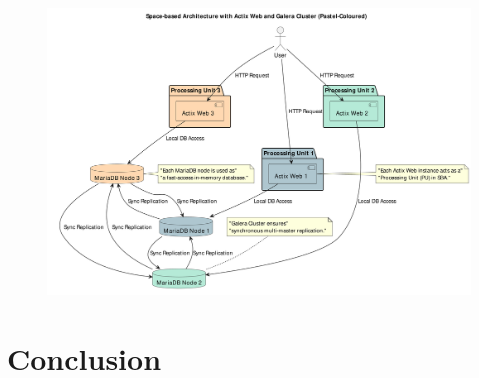 \documentclass[aspectratio=169, table]{beamer}
\begin{document}
	{
		\begin{frame}[plain]
			\begin{figure}
				\centering
				\includegraphics[height=\textheight]{../../images/out/space-based_architecture.pdf}
		\end{figure}	
		\end{frame}
	}
	
	
	
	\section{Conclusion}
	
\end{document}
